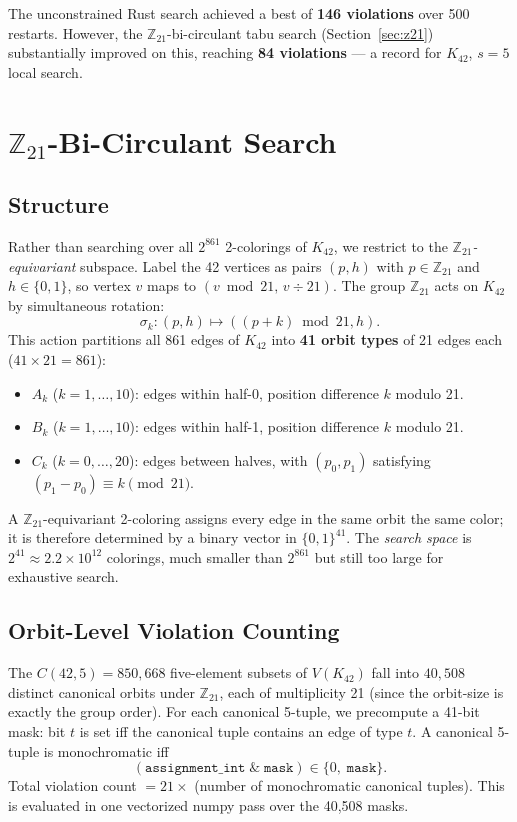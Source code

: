 \documentclass[11pt]{article}
\begin{document}
The unconstrained Rust search achieved a best of \textbf{146 violations}
over 500 restarts. However, the $\mathbb{Z}_{21}$-bi-circulant tabu search
(Section~\ref{sec:z21}) substantially improved on this, reaching
\textbf{84 violations} --- a record for $K_{42}$, $s=5$ local search.

\section{\texorpdfstring{$\mathbb{Z}_{21}$}{Z21}-Bi-Circulant Search}

\subsection{Structure}

Rather than searching over all $2^{861}$ 2-colorings of $K_{42}$, we restrict
to the \emph{$\mathbb{Z}_{21}$-equivariant} subspace.
Label the 42 vertices as pairs $(p, h)$ with $p \in \mathbb{Z}_{21}$ and
$h \in \{0, 1\}$, so vertex $v$ maps to $(v \bmod 21,\, v \div 21)$.
The group $\mathbb{Z}_{21}$ acts on $K_{42}$ by simultaneous rotation:
\[
\sigma_k : (p, h) \mapsto ((p+k) \bmod 21, h).
\]
This action partitions all 861 edges of $K_{42}$ into \textbf{41 orbit types}
of 21 edges each ($41 \times 21 = 861$):
\begin{itemize}
\item $A_k$ ($k=1,\ldots,10$): edges within half-0, position difference $k$ modulo 21.
\item $B_k$ ($k=1,\ldots,10$): edges within half-1, position difference $k$ modulo 21.
\item $C_k$ ($k=0,\ldots,20$): edges between halves, with $(p_0, p_1)$ satisfying
      $(p_1 - p_0) \equiv k \pmod{21}$.
\end{itemize}
A $\mathbb{Z}_{21}$-equivariant 2-coloring assigns every edge in the same orbit
the same color; it is therefore determined by a binary vector in $\{0,1\}^{41}$.
The \emph{search space} is $2^{41} \approx 2.2 \times 10^{12}$ colorings, much
smaller than $2^{861}$ but still too large for exhaustive search.

\subsection{Orbit-Level Violation Counting}

The $C(42,5) = 850{,}668$ five-element subsets of $V(K_{42})$ fall into
$40{,}508$ distinct canonical orbits under $\mathbb{Z}_{21}$, each of
multiplicity 21 (since the orbit-size is exactly the group order).
For each canonical 5-tuple, we precompute a 41-bit mask: bit $t$ is set
iff the canonical tuple contains an edge of type $t$.
A canonical 5-tuple is monochromatic iff
\[
(\texttt{assignment\_int} \;\&\; \texttt{mask}) \in \{0,\; \texttt{mask}\}.
\]
Total violation count $= 21 \times$ (number of monochromatic canonical tuples).
This is evaluated in one vectorized numpy pass over the 40,508 masks.
\end{document}
